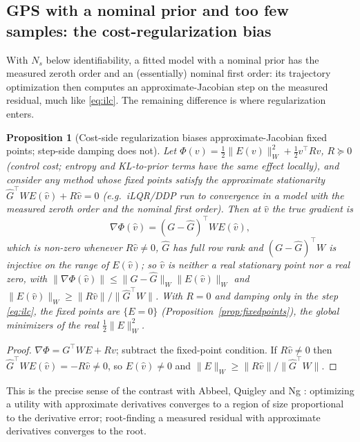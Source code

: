 \documentclass[11pt]{article}
\newtheorem{proposition}[theorem]{Proposition}
\theoremstyle{definition}
\theoremstyle{remark}
\newcommand{\nW}[1]{\lVert #1\rVert_W}
\newcommand{\n}[1]{\lVert #1\rVert}
\newcommand{\Ghat}{\widehat G}
\begin{document}
\subsection{GPS with a nominal prior and too few samples: the cost-regularization bias}
With $N_s$ below identifiability, a fitted model with a nominal prior has the measured zeroth order and an (essentially)
nominal first order: its trajectory optimization then computes an approximate-Jacobian step on the measured residual,
much like \eqref{eq:ilc}. The remaining difference is where regularization enters.
\begin{proposition}[Cost-side regularization biases approximate-Jacobian fixed points; step-side damping does not]\label{prop:regbias}
Let $\Phi(v)=\tfrac12\nW{E(v)}^2+\tfrac12 v^\top Rv$, $R\succeq0$ (control cost; entropy and KL-to-prior terms have
the same effect locally), and consider any method whose fixed points satisfy the approximate stationarity
$\Ghat^\top WE(\hat v)+R\hat v=0$ (e.g.\ iLQR/DDP run to convergence in a model with the measured zeroth order and the
nominal first order). Then at $\hat v$ the true gradient is
\[\nabla\Phi(\hat v)=(G-\Ghat)^\top W E(\hat v),\]
which is non-zero whenever $R\hat v\ne0$, $\Ghat$ has full row rank and $(G-\Ghat)^\top W$ is injective on the range
of $E(\hat v)$; so $\hat v$ is neither a real stationary point nor a real zero, with
$\n{\nabla\Phi(\hat v)}\le\n{G-\Ghat}_W\nW{E(\hat v)}$ and $\nW{E(\hat v)}\ge\n{R\hat v}/\n{\Ghat^\top W}$. With
$R=0$ and damping only in the step \eqref{eq:ilc}, the fixed points are $\{E=0\}$ (Proposition~\ref{prop:fixedpoints}),
the global minimizers of the real $\tfrac12\nW E^2$.
\end{proposition}
\begin{proof}
$\nabla\Phi=G^\top WE+Rv$; subtract the fixed-point condition. If $R\hat v\neq0$ then $\Ghat^\top WE(\hat v)=-R\hat
v\neq0$, so $E(\hat v)\ne0$ and $\nW{E}\ge\n{R\hat v}/\n{\Ghat^\top W}$.
\end{proof}
This is the precise sense of the contrast with Abbeel, Quigley and Ng \cite{abbeel2006inaccurate}: optimizing a utility
with approximate derivatives converges to a region of size proportional to the derivative error; root-finding a
measured residual with approximate derivatives converges to the root.
\end{document}
